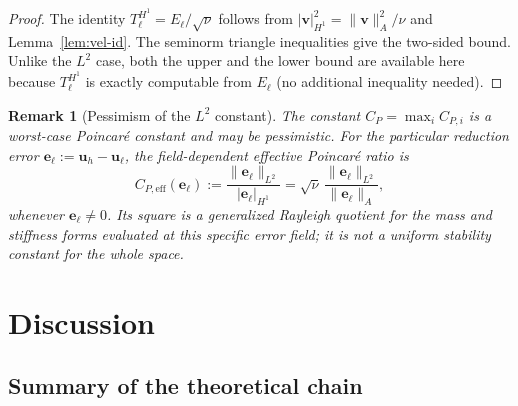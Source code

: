 \documentclass[11pt,a4paper]{article}
\newtheorem{remark}[theorem]{Remark}
\theoremstyle{definition}
\newcommand{\vel}{\bm{u}}
\begin{document}
\begin{proof}
  The identity $T_\ell^{H^1} = E_\ell/\sqrt{\nu}$ follows from
  $|\bm{v}|_{H^1}^2 = \|\bm{v}\|_A^2/\nu$ and Lemma~\ref{lem:vel-id}.
  The seminorm triangle inequalities give the two-sided bound.
  Unlike the $L^2$ case, both the upper and the lower bound are
  available here because $T_\ell^{H^1}$ is exactly computable
  from $E_\ell$ (no additional inequality needed).
\end{proof}

\begin{remark}[Pessimism of the $L^2$ constant]\label{rem:CP}
  The constant $C_P=\max_i C_{P,i}$ is a worst-case Poincar\'e constant
  and may be pessimistic.  For the particular reduction error
  $\bm{e}_\ell:=\vel_h-\vel_\ell$, the field-dependent effective
  Poincar\'e ratio is
  \[
    C_{P,\mathrm{eff}}(\bm{e}_\ell)
      :=\frac{\|\bm{e}_\ell\|_{L^2}}{|\bm{e}_\ell|_{H^1}}
      =\sqrt{\nu}\,\frac{\|\bm{e}_\ell\|_{L^2}}
                              {\|\bm{e}_\ell\|_A},
  \]
  whenever $\bm{e}_\ell\neq0$.  Its square is a generalized Rayleigh
  quotient for the mass and stiffness forms evaluated at this specific
  error field; it is not a uniform stability constant for the whole
  space.
\end{remark}

\section{Discussion}

\subsection{Summary of the theoretical chain}
\end{document}
